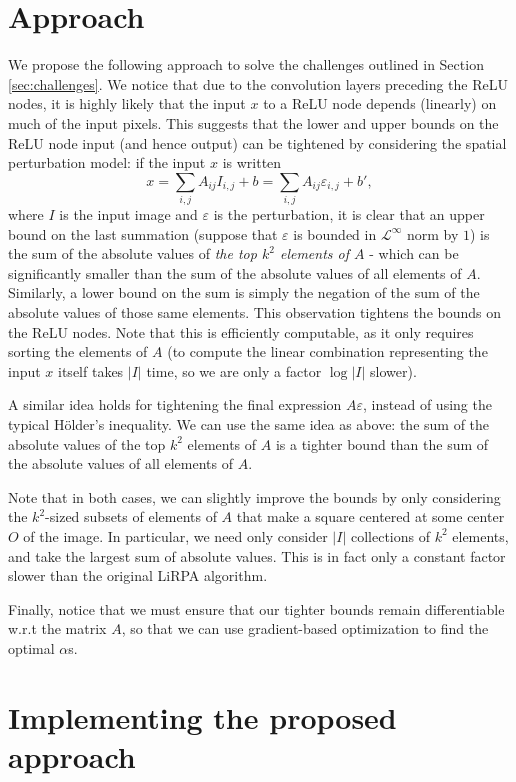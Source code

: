 \documentclass{article}
\begin{document}
\section{Approach}\label{sec:approach}

We propose the following approach to solve the challenges outlined in Section \ref{sec:challenges}. We notice that due to the convolution layers preceding the ReLU nodes, it is highly likely that the input $x$ to a ReLU node depends (linearly) on much of the input pixels. This suggests that the lower and upper bounds on the ReLU node input (and hence output) can be tightened by considering the spatial perturbation model: if the input $x$ is written
\[
    x = \sum_{i,j} A_{ij} I_{i,j} + b = \sum_{i,j} A_{ij} \varepsilon_{i,j} + b',
\]
where $I$ is the input image and $\varepsilon$ is the perturbation, it is clear that an upper bound on the last summation (suppose that $\varepsilon$ is bounded in $\mathcal L^\infty$ norm by $1$) is the sum of the absolute values of \emph{the top $k^2$ elements of $A$} - which can be significantly smaller than the sum of the absolute values of all elements of $A$. Similarly, a lower bound on the sum is simply the negation of the sum of the absolute values of those same elements. This observation tightens the bounds on the ReLU nodes. Note that this is efficiently computable, as it only requires sorting the elements of $A$ (to compute the linear combination representing the input $x$ itself takes $|I|$ time, so we are only a factor $\log |I|$ slower).

A similar idea holds for tightening the final expression $A\varepsilon$, instead of using the typical Hölder's inequality. We can use the same idea as above: the sum of the absolute values of the top $k^2$ elements of $A$ is a tighter bound than the sum of the absolute values of all elements of $A$.

Note that in both cases, we can slightly improve the bounds by only considering the $k^2$-sized subsets of elements of $A$ that make a square centered at some center $O$ of the image. In particular, we need only consider $|I|$ collections of $k^2$ elements, and take the largest sum of absolute values. This is in fact only a constant factor slower than the original LiRPA algorithm.

Finally, notice that we must ensure that our tighter bounds remain differentiable w.r.t the matrix $A$, so that we can use gradient-based optimization to find the optimal $\alpha$s. 


\newpage
\section{Implementing the proposed approach}
\end{document}

